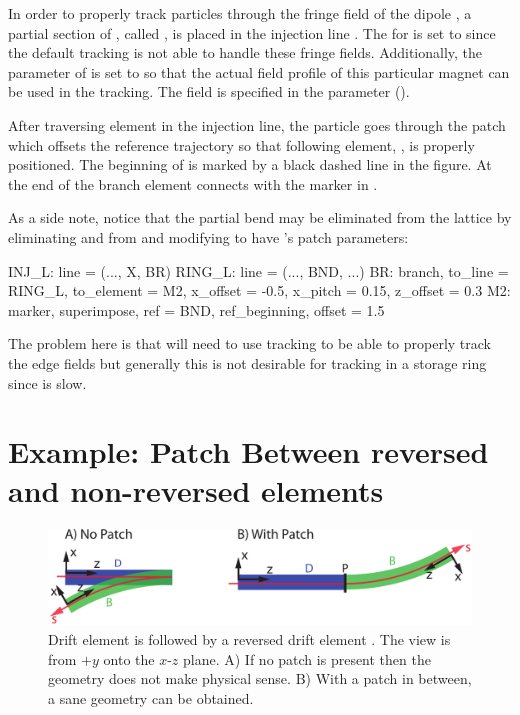 In order to properly track particles through the fringe field of the
dipole , a partial section of , called , is
placed in the injection line . The  for
 is set to  since the default
 tracking is not able to handle these fringe
fields. Additionally, the  parameter of  is
set to  so that the actual field profile of this particular
magnet can be used in the tracking. The field is specified in the
 parameter (). 

After traversing element  in the injection line, the particle
goes through the patch  which offsets the reference trajectory
so that following element, , is properly positioned.  The
beginning of  is marked by a black dashed line in the figure.
At the end of  the branch element  connects 
with the marker  in .

As a side note, notice that the partial bend  may be
eliminated from the lattice by eliminating  and  from
 and modifying  to have 's patch parameters:
\begin{example}
  INJ_L: line = (..., X, BR)
  RING_L: line = (..., BND, ...)
  BR: branch, to_line = RING_L, to_element = M2,
          x_offset = -0.5, x_pitch = 0.15, z_offset = 0.3
  M2: marker, superimpose, ref = BND, ref_beginning, offset = 1.5
\end{example}
The problem here is that  will need to use 
tracking to be able to properly track the edge fields but generally
this is not desirable for tracking in a storage ring since
 is slow.

\section{Example: Patch Between reversed and non-reversed elements}
\label{s:ex.patch}

\begin{figure}[tb]
  \centering
  \includegraphics[width=5in]{patch-between.pdf}
  \caption[Patching between reversed and non-reversed elements.]{
Drift element  is followed by a reversed drift element .
The view is from $+y$ onto the $x$-$z$ plane. A) If no patch is
present then the geometry does not make physical sense. B) With a
patch in between, a sane geometry can be obtained.}
  \label{f:patch.between}
\end{figure}

